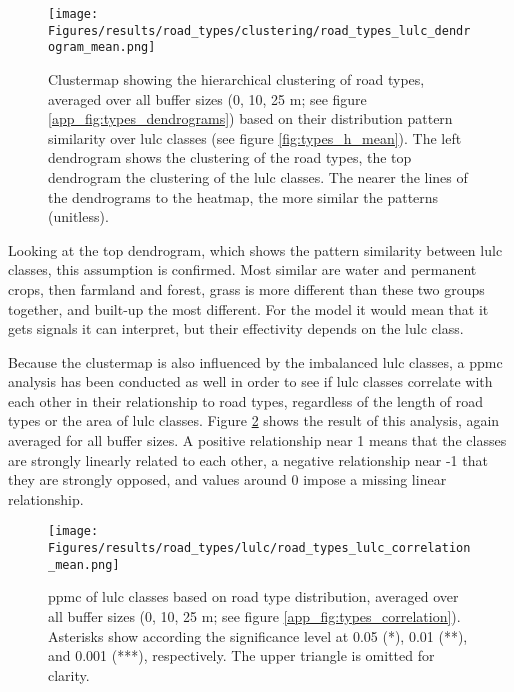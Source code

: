 \begin{figure}[htb]
    \centering
    \texttt{[image: Figures/results/road\_types/clustering/road\_types\_lulc\_dendrogram\_mean.png]}
    \caption[Clustermap of Road Types vs.  Classes]{Clustermap showing the hierarchical clustering of road types, averaged over all buffer sizes (0, 10, 25 m; see figure \ref{app_fig:types_dendrograms}) based on their distribution pattern similarity over \gls{lulc} classes (see figure \ref{fig:types_h_mean}). The left dendrogram shows the clustering of the road types, the top dendrogram the clustering of the \gls{lulc} classes. The nearer the lines of the dendrograms to the heatmap, the more similar the patterns (unitless).}
    \label{fig:types_clustermap}
\end{figure}

Looking at the top dendrogram, which shows the pattern similarity between \gls{lulc} classes, this assumption is confirmed. Most similar are water and permanent crops, then farmland and forest, grass is more different than these two groups together, and built-up the most different. For the model it would mean that it gets signals it can interpret, but their effectivity depends on the \gls{lulc} class.

Because the clustermap is also influenced by the imbalanced \gls{lulc} classes, a \gls{ppmc} analysis has been conducted as well in order to see if \gls{lulc} classes correlate with each other in their relationship to road types, regardless of the length of road types or the area of \gls{lulc} classes. Figure \ref{fig:pmcc_types_mean} shows the result of this analysis, again averaged for all buffer sizes. A positive relationship near 1 means that the classes are strongly linearly related to each other, a negative relationship near -1 that they are strongly opposed, and values around 0 impose a missing linear relationship.

\begin{figure}[htb]
    \centering
    \texttt{[image: Figures/results/road\_types/lulc/road\_types\_lulc\_correlation\_mean.png]}
    \caption[ of  Classes Based on Road Types]{\gls{ppmc} of \gls{lulc} classes based on road type distribution, averaged over all buffer sizes (0, 10, 25 m; see figure \ref{app_fig:types_correlation}). Asterisks show according the significance level at 0.05 (*), 0.01 (**), and 0.001 (***), respectively. The upper triangle is omitted for clarity.}
    \label{fig:pmcc_types_mean}
\end{figure}

